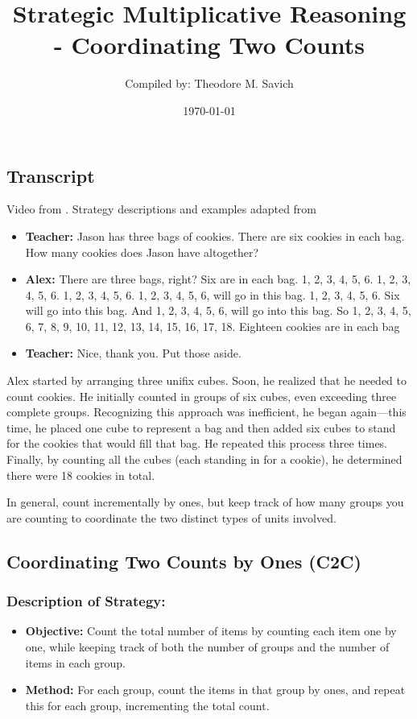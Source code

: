 \documentclass[11pt]{article}
\title{Strategic Multiplicative Reasoning - Coordinating Two Counts}
\author{Compiled by: Theodore M. Savich}
\date{\today}
\begin{document}
\maketitle

\subsection*{Transcript}
Video from \textcite{Carpenter1999}. Strategy descriptions and examples adapted from \textcite{HackenbergCourseNotes}

\begin{itemize}
      \item \textbf{Teacher:} Jason has three bags of cookies. There are six cookies in each bag. How many cookies does Jason have altogether? 
      \item \textbf{Alex:} There are three bags, right? Six are in each bag. 1, 2, 3, 4, 5, 6. 1, 2, 3, 4, 5, 6. 1, 2, 3, 4, 5, 6. 1, 2, 3, 4, 5, 6, will go in this bag. 1, 2, 3, 4, 5, 6. Six will go into this bag. And 1, 2, 3, 4, 5, 6, will go into this bag. So 1, 2, 3, 4, 5, 6, 7, 8, 9, 10, 11, 12, 13, 14, 15, 16, 17, 18. Eighteen cookies are in each bag
      \item \textbf{Teacher:} Nice, thank you. Put those aside.
\end{itemize}

\noindent 
Alex started by arranging three unifix cubes. Soon, he realized that he needed to count cookies. He initially counted in groups of six cubes, even exceeding three complete groups. Recognizing this approach was inefficient, he began again—this time, he placed one cube to represent a bag and then added six cubes to stand for the cookies that would fill that bag. He repeated this process three times. Finally, by counting all the cubes (each standing in for a cookie), he determined there were 18 cookies in total.

In general, count incrementally by ones, but keep track of how many groups you are counting to coordinate the two distinct types of units involved.

\subsection*{Coordinating Two Counts by Ones (C2C)}

\subsubsection*{Description of Strategy:}
\begin{itemize}
    \item \textbf{Objective:} Count the total number of items by counting each item one by one, while keeping track of both the number of groups and the number of items in each group.
    \item \textbf{Method:} For each group, count the items in that group by ones, and repeat this for each group, incrementing the total count.
\end{itemize}
\end{document}
